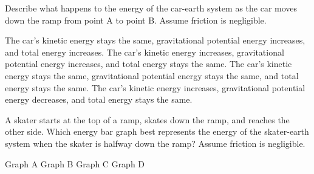 \documentclass[]{exam}
\begin{document}
\begin{questions}

\question
Describe what happens to the energy of the car-earth system as the car moves down the ramp from point A to point B. Assume friction is negligible. 

\begin{center}
\end{center}

\begin{randomizechoices}[norandomize]
    \choice The car's kinetic energy stays the same, gravitational potential energy increases, and total energy increases.
    \choice The car's kinetic energy increases, gravitational potential energy increases, and total energy stays the same.
    \choice The car's kinetic energy stays the same, gravitational potential energy stays the same, and total energy stays the same.
    \correctchoice The car's kinetic energy increases, gravitational potential energy decreases, and total energy stays the same.
\end{randomizechoices}

\question
A skater starts at the top of a ramp,  skates down the ramp, and reaches the other side. Which energy bar graph best represents the energy of the skater-earth system when the skater is halfway down the ramp? Assume friction is negligible.



\begin{minipage}{0.6\textwidth}
\centering
{}
\end{minipage}%
\begin{minipage}{0.35\textwidth}
    \centering
    \begin{randomizechoices}[norandomize]
        \choice Graph A
        \correctchoice Graph B
        \choice Graph C
        \choice Graph D
    \end{randomizechoices}    
\end{minipage}%


\end{questions}
\end{document}
